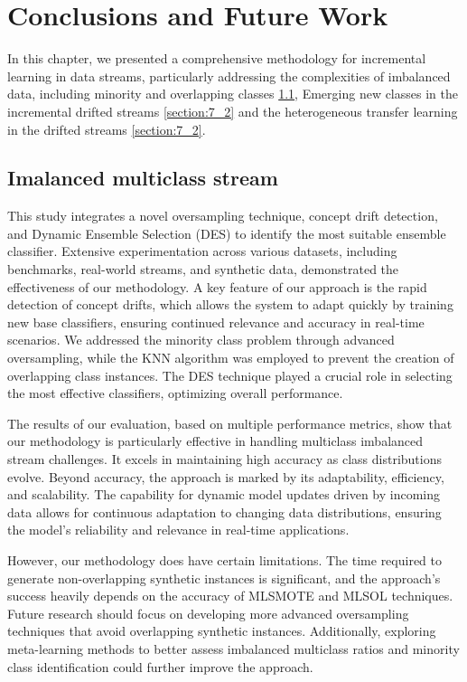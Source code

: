 
\chapter{Conclusions and Future Work}
\label{chapter:7_Conclusions}
In this chapter, we presented a comprehensive methodology for incremental learning in data streams, particularly addressing the complexities of imbalanced data, including minority and overlapping classes \ref{section:7_1}, Emerging new classes in the incremental drifted streams \ref{section:7_2} and the heterogeneous transfer learning in the drifted streams \ref{section:7_2}.

\section{Imalanced multiclass stream}
\label{section:7_1}

This study integrates a novel oversampling technique, concept drift detection, and Dynamic Ensemble Selection (DES) to identify the most suitable ensemble classifier. Extensive experimentation across various datasets, including benchmarks, real-world streams, and synthetic data, demonstrated the effectiveness of our methodology.
A key feature of our approach is the rapid detection of concept drifts, which allows the system to adapt quickly by training new base classifiers, ensuring continued relevance and accuracy in real-time scenarios. We addressed the minority class problem through advanced oversampling, while the KNN algorithm was employed to prevent the creation of overlapping class instances. The DES technique played a crucial role in selecting the most effective classifiers, optimizing overall performance.

The results of our evaluation, based on multiple performance metrics, show that our methodology is particularly effective in handling multiclass imbalanced stream challenges. It excels in maintaining high accuracy as class distributions evolve. Beyond accuracy, the approach is marked by its adaptability, efficiency, and scalability. The capability for dynamic model updates driven by incoming data allows for continuous adaptation to changing data distributions, ensuring the model's reliability and relevance in real-time applications.

However, our methodology does have certain limitations. The time required to generate non-overlapping synthetic instances is significant, and the approach's success heavily depends on the accuracy of MLSMOTE and MLSOL techniques. Future research should focus on developing more advanced oversampling techniques that avoid overlapping synthetic instances. Additionally, exploring meta-learning methods to better assess imbalanced multiclass ratios and minority class identification could further improve the approach.

